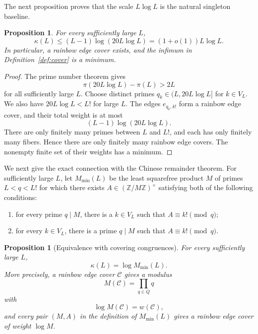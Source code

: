 \documentclass[11pt]{amsart}
\newtheorem{proposition}[theorem]{Proposition}
\theoremstyle{definition}
\theoremstyle{remark}
\begin{document}
The next proposition proves that the scale $L\log L$ is the natural
singleton baseline.

\begin{proposition}\label{prop:baseline}
For every sufficiently large $L$,
\[
\kappa(L)\leq(L-1)\log(20L\log L)
=(1+o(1))L\log L.
\]
In particular, a rainbow edge cover exists, and the infimum in
Definition~\ref{def:cover} is a minimum.
\end{proposition}

\begin{proof}
The prime number theorem gives
\[
\pi(20L\log L)-\pi(L)>2L
\]
for all sufficiently large $L$.  Choose distinct primes
$q_k\in(L,20L\log L]$ for $k\in V_L$.  We also have
$20L\log L<L!$ for large $L$.  The edges $e_{q_k,k!}$ form a rainbow edge
cover, and their total weight is at most
\[
(L-1)\log(20L\log L).
\]
There are only finitely many primes between $L$ and $L!$, and each has only
finitely many fibers.  Hence there are only finitely many rainbow edge covers.
The nonempty finite set of their weights has a minimum.
\end{proof}

We next give the exact connection with the Chinese remainder theorem.  For
sufficiently large $L$, let $M_{\min}(L)$ be the least squarefree product
$M$ of primes $L<q<L!$ for which there exists
$A\in(\mathbb Z/M\mathbb Z)^\times$ satisfying both of the following
conditions:
\begin{enumerate}
\item for every prime $q\mid M$, there is a $k\in V_L$ such that
$A\equiv k!\pmod q$;
\item for every $k\in V_L$, there is a prime $q\mid M$ such that
$A\equiv k!\pmod q$.
\end{enumerate}

\begin{proposition}[Equivalence with covering congruences]
\label{prop:crt-equivalence}
For every sufficiently large $L$,
\[
\kappa(L)=\log M_{\min}(L).
\]
More precisely, a rainbow edge cover $\mathcal C$ gives a modulus
\[
M(\mathcal C)=\prod_{q\in Q}q
\]
with
\[
\log M(\mathcal C)=w(\mathcal C),
\]
and every pair $(M,A)$ in the definition of $M_{\min}(L)$ gives a rainbow
edge cover of weight $\log M$.
\end{proposition}
\end{document}
